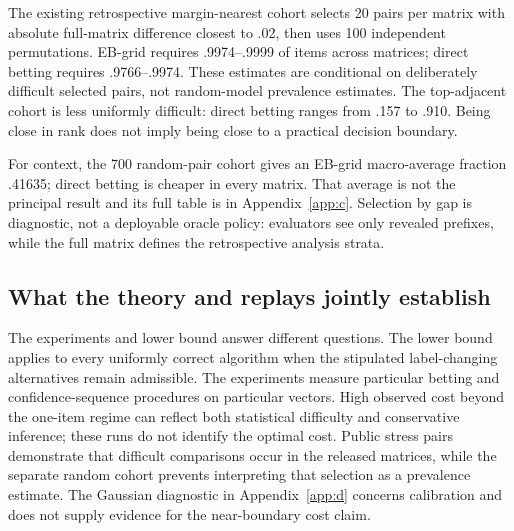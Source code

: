 The existing retrospective margin-nearest cohort selects 20 pairs per matrix with absolute full-matrix difference closest to .02, then uses 100 independent permutations. EB-grid requires .9974--.9999 of items across matrices; direct betting requires .9766--.9974. These estimates are conditional on deliberately difficult selected pairs, not random-model prevalence estimates. The top-adjacent cohort is less uniformly difficult: direct betting ranges from .157 to .910. Being close in rank does not imply being close to a practical decision boundary.

For context, the 700 random-pair cohort gives an EB-grid macro-average fraction .41635; direct betting is cheaper in every matrix. That average is not the principal result and its full table is in Appendix~\ref{app:c}. Selection by gap is diagnostic, not a deployable oracle policy: evaluators see only revealed prefixes, while the full matrix defines the retrospective analysis strata.

\subsection{What the theory and replays jointly establish}\label{what-the-theory-and-replays-jointly-establish}

The experiments and lower bound answer different questions. The lower bound applies to every uniformly correct algorithm when the stipulated label-changing alternatives remain admissible. The experiments measure particular betting and confidence-sequence procedures on particular vectors. High observed cost beyond the one-item regime can reflect both statistical difficulty and conservative inference; these runs do not identify the optimal cost. Public stress pairs demonstrate that difficult comparisons occur in the released matrices, while the separate random cohort prevents interpreting that selection as a prevalence estimate. The Gaussian diagnostic in Appendix~\ref{app:d} concerns calibration and does not supply evidence for the near-boundary cost claim.
